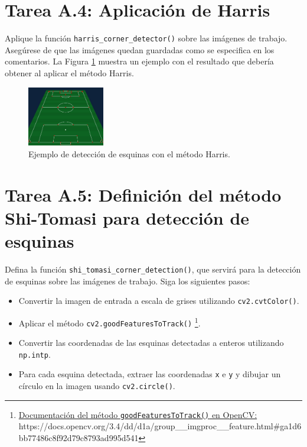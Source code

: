 \section*{Tarea A.4: Aplicación de Harris}
Aplique la función \texttt{harris\_corner\_detector()} sobre las imágenes de trabajo. Asegúrese de que las imágenes quedan guardadas como se especifica en los comentarios. La Figura \ref{fig:ejemplo_harris} muestra un ejemplo con el resultado que debería obtener al aplicar el método Harris.

\begin{figure}[H]
    \centering
    \includegraphics[width=0.3\textwidth]{Lab_3/template/figures/Harris_football.jpg}
    \caption{Ejemplo de detección de esquinas con el método Harris.}
    \label{fig:ejemplo_harris}
\end{figure}


\section*{Tarea A.5: Definición del método  Shi-Tomasi para detección de esquinas}
Defina la función \texttt{shi\_tomasi\_corner\_detection()}, que servirá para la detección de esquinas sobre las imágenes de trabajo. Siga los siguientes pasos:

\begin{itemize}
    \item Convertir la imagen de entrada a escala de grises utilizando \texttt{cv2.cvtColor()}.
    \item Aplicar el método \texttt{cv2.goodFeaturesToTrack()} \footnote{ \href{https://docs.opencv.org/3.4/dd/d1a/group\_\_imgproc\_\_feature.html\#ga1d6bb77486c8f92d79c8793ad995d541}{Documentación del método \texttt{goodFeaturesToTrack()} en OpenCV:} \\{https://docs.opencv.org/3.4/dd/d1a/group\_\_imgproc\_\_feature.html\#ga1d6bb77486c8f92d79c8793ad995d541}}.
    \item Convertir las coordenadas de las esquinas detectadas a enteros utilizando \texttt{np.intp}.
    \item Para cada esquina detectada, extraer las coordenadas \texttt{x} e \texttt{y} y dibujar un círculo en la imagen usando \texttt{cv2.circle()}.
\end{itemize}


